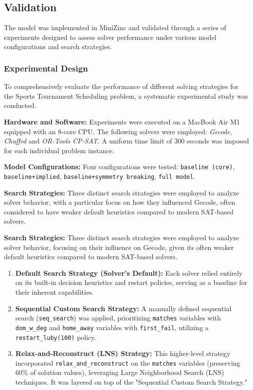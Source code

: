 \documentclass{article}
\begin{document}
\subsection{Validation}

The model was implemented in MiniZinc and validated through a series of experiments designed to assess solver performance under various model configurations and search strategies.

\subsubsection{Experimental Design}

To comprehensively evaluate the performance of different solving strategies for the Sports Tournament Scheduling problem, a systematic experimental study was conducted.

\textbf{Hardware and Software:}
Experiments were executed on a MacBook Air M1 equipped with an 8-core CPU. The following solvers were employed: \textit{Gecode}, \textit{Chuffed} and \textit{OR-Tools CP-SAT}. 
A uniform time limit of $300$ seconds was imposed for each individual problem instance.

\textbf{Model Configurations:}
Four configurations were tested: \texttt{baseline (core)}, \texttt{baseline+implied}, \texttt{baseline+symmetry breaking}, \texttt{full model}.

\textbf{Search Strategies:}
Three distinct search strategies were employed to analyze solver behavior, with a particular focus on how they influenced Gecode, often considered to have weaker default heuristics compared to modern SAT-based solvers.

\textbf{Search Strategies:}
Three distinct search strategies were employed to analyze solver behavior, focusing on their influence on Gecode, given its often weaker default heuristics compared to modern SAT-based solvers.

\begin{enumerate}
    \item \textbf{Default Search Strategy (Solver's Default):} Each solver relied entirely on its built-in decision heuristics and restart policies, serving as a baseline for their inherent capabilities.

    \item \textbf{Sequential Custom Search Strategy:} A manually defined sequential search (\texttt{seq\_search}) was applied, prioritizing \texttt{matches} variables with \texttt{dom\_w\_deg} and \texttt{home\_away} variables with \texttt{first\_fail}, utilizing a \texttt{restart\_luby(100)} policy.

    \item \textbf{Relax-and-Reconstruct (LNS) Strategy:} This higher-level strategy incorporated \texttt{relax\_and\_reconstruct} on the \texttt{matches} variables (preserving 60\% of solution values), leveraging Large Neighborhood Search (LNS) techniques. It was layered on top of the "Sequential Custom Search Strategy."
\end{enumerate}
\end{document}

